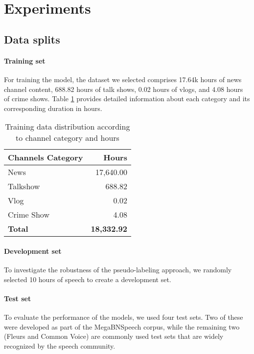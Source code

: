 \section{Experiments}
\label{sec:experiments}

\subsection{Data splits}

\paragraph{Training set} 
For training the model, the dataset we selected comprises 17.64k hours of news channel content, 688.82 hours of talk shows, 0.02 hours of vlogs, and 4.08 hours of crime shows. Table \ref{tab:category_wise_training_data_dist} provides detailed information about each category and its corresponding duration in hours.

\begin{table}[h]
\centering
\begin{tabular}{lr}
\hline
\textbf{Channels Category} & \textbf{Hours}\\
\hline
News & 17,640.00\\
Talkshow & 688.82\\
Vlog & 0.02 \\
Crime Show & 4.08 \\
\textbf{Total} & \textbf{18,332.92}\\ 
\hline
\end{tabular}
\caption{Training data distribution according to channel category and hours}
\label{tab:category_wise_training_data_dist}
\end{table}

\paragraph{Development set}
To investigate the robustness of the pseudo-labeling approach, we randomly selected 10 hours of speech to create a development set. 

\paragraph{Test set}
To evaluate the performance of the models, we used four test sets. Two of these were developed as part of the MegaBNSpeech corpus, while the remaining two (Fleurs and Common Voice) are commonly used test sets that are widely recognized by the speech community. 

